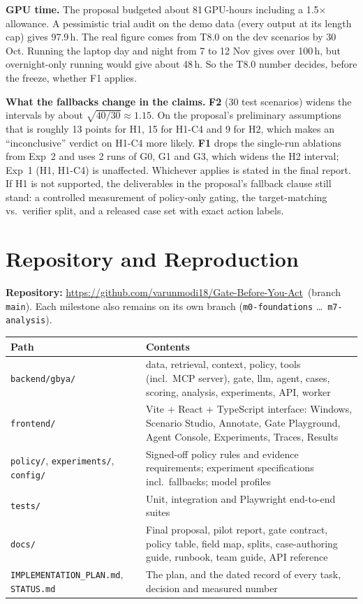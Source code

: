 \documentclass[11pt,a4paper]{article}
\newcommand{\code}[1]{\texttt{\small #1}}
\newcommand{\repo}{\url{https://github.com/varunmodi18/Gate-Before-You-Act}}
\begin{document}
\textbf{GPU time.} The proposal budgeted about 81\,GPU-hours including a 1.5$\times$ allowance. A pessimistic trial audit on the demo data (every output at its length cap) gives 97.9\,h. The real figure comes from T8.0 on the dev scenarios by 30 Oct. Running the laptop day and night from 7 to 12 Nov gives over 100\,h, but overnight-only running would give about 48\,h. So the T8.0 number decides, before the freeze, whether F1 applies.

\textbf{What the fallbacks change in the claims.} \textbf{F2} (30 test scenarios) widens the intervals by about $\sqrt{40/30}\approx1.15$. On the proposal's preliminary assumptions that is roughly 13 points for H1, 15 for H1-C4 and 9 for H2, which makes an ``inconclusive'' verdict on H1-C4 more likely. \textbf{F1} drops the single-run ablations from Exp~2 and uses 2 runs of G0, G1 and G3, which widens the H2 interval; Exp~1 (H1, H1-C4) is unaffected. Whichever applies is stated in the final report. If H1 is not supported, the deliverables in the proposal's fallback clause still stand: a controlled measurement of policy-only gating, the target-matching vs.\ verifier split, and a released case set with exact action labels.

\section{Repository and Reproduction}
\textbf{Repository:} \repo\ (branch \code{main}). Each milestone also remains on its own branch (\code{m0-foundations} \dots\ \code{m7-analysis}).

{\small
\begin{tabularx}{\linewidth}{@{}>{\raggedright\arraybackslash}p{4.2cm}L@{}}
\toprule
\textbf{Path} & \textbf{Contents}\\
\midrule
\code{backend/gbya/} & data, retrieval, context, policy, tools (incl.\ MCP server), gate, llm, agent, cases, scoring, analysis, experiments, API, worker \\
\code{frontend/} & Vite + React + TypeScript interface: Windows, Scenario Studio, Annotate, Gate Playground, Agent Console, Experiments, Traces, Results \\
\code{policy/}, \code{experiments/}, \code{config/} & Signed-off policy rules and evidence requirements; experiment specifications incl.\ fallbacks; model profiles \\
\code{tests/} & Unit, integration and Playwright end-to-end suites \\
\code{docs/} & Final proposal, pilot report, gate contract, policy table, field map, splits, case-authoring guide, runbook, team guide, API reference \\
\code{IMPLEMENTATION\_PLAN.md}, \code{STATUS.md} & The plan, and the dated record of every task, decision and measured number \\
\bottomrule
\end{tabularx}}
\end{document}
